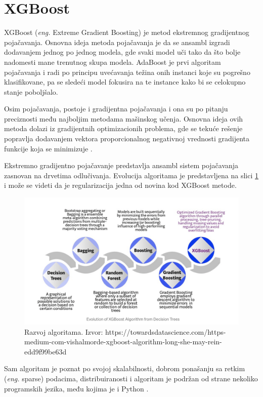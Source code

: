 \documentclass[12pt,oneside]{memoir}
\begin{document}
\section{XGBoost}
XGBoost (\textit{eng.} Extreme Gradient Boosting) je metod ekstremnog gradijentnog pojačavanja. Osnovna ideja metoda pojačavanja je da se ansambl izgradi dodavanjem jednog po jednog modela, gde svaki model uči tako da što bolje nadomesti mane trenutnog skupa modela. AdaBoost je prvi algoritam pojačavanja i radi po principu uvećavanja težina onih instanci koje su pogrešno klasifikovane, pa se sledeći model fokusira na te instance kako bi se celokupno stanje poboljšalo. 

Osim pojačavanja, postoje i gradijentna pojačavanja i ona su po pitanju preciznosti među najboljim metodama mašinskog učenja. Osnovna ideja ovih metoda dolazi iz gradijentnih optimizacionih problema, gde se tekuće rešenje popravlja dodavanjem vektora proporcionalnog negativnoj vrednosti gradijenta funkcije koja se minimizuje \cite{ml}. 

Ekstremno gradijentno pojačavanje predstavlja ansambl sistem pojačavanja zasnovan na drvetima odlučivanja. Evolucija algoritama je predstavljena na slici \ref{fig: xgboost_evolucija} i može se videti da je regularizacija jedna od novina kod XGBoost metode.

\begin{figure}[!ht]
  \centering
  \includegraphics[width=1\textwidth]{./grafici/xgboost_evolucija.png}
  \caption[Razvoj algoritama. Izvor: \textit{towardsdatascience}]
  {Razvoj algoritama. Izvor: https://towardsdatascience.com/https-medium-com-vishalmorde-xgboost-algorithm-long-she-may-rein-edd9f99be63d}
  \label{fig: xgboost_evolucija}
\end{figure}
Sam algoritam je poznat po svojoj skalabilnosti, dobrom ponašanju sa retkim (\textit{eng.} sparse) podacima, distribuiranosti i algoritam je podržan od strane nekoliko programskih jezika, među kojima je i Python \cite{chen2016xgboost}.
\end{document}
